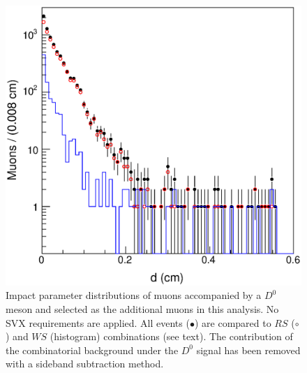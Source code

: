 \documentclass[aps,prd,preprint,floatfix,nofootinbib,superscriptaddress,showpacs,amssymb]{revtex4}
\begin{document}
 \begin{figure}
 \begin{center}
 \vspace{-0.3in}
 \leavevmode
 \includegraphics*[width=\textwidth]{muD0.eps}
 \caption[]{Impact parameter distributions of muons accompanied by a $D^0$
            meson and selected as the additional muons in this analysis.
            No SVX requirements are applied. All events ($\bullet$) are
            compared to $RS$  ($\circ$) and  $WS$ (histogram) combinations
            (see text). The contribution of the combinatorial background
            under the $D^0$ signal has been removed with a sideband
            subtraction method.}
 \label{fig:fig_15tris}
 \end{center}
 \end{figure}
\end{document}
